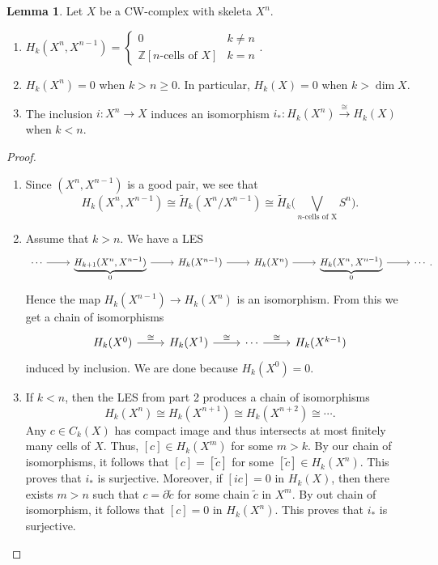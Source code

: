 \documentclass[10pt,letterpaper,cm]{nupset}
\theoremstyle{definition}
\theoremstyle{theorem}
\newtheorem{lemma}[definition]{Lemma}
\theoremstyle{remark}
\newcommand{\Z}{\mathbb Z}
\newcommand{\1}{\mathbb{1}}
\newcommand{\0}{\vec 0}
\begin{document}
\begin{lemma}
Let $X$ be a CW-complex with skeleta $X^n$.
\begin{enumerate}
\item $H_k(X^n, X^{n-1}) =\begin{cases}  0 & k\ne n \\ \Z[n\text{-cells of } X] & k= n  \end{cases}$.
\item $H_k(X^n) =0$ when $k>n\geq 0$. In particular, $H_k(X) = 0$ when $k> \dim{X}$.
\item The inclusion $i: X^n \to X$ induces an isomorphism $i_{\ast} : H_k(X^n) \overset{\cong}{\longrightarrow} H_k(X)$ when $k<n$.
\end{enumerate}
\end{lemma}
\begin{proof} $ $
\begin{enumerate}
\item Since $(X^n, X^{n-1})$ is a good pair, we see that $$H_k(X^n, X^{n-1}) \cong \widetilde{H}_k(X^n/X^{n-1}) \cong \widetilde{H}_k \big (\bigvee_{n\text{-cells of X}} S^n \big ).$$
\item Assume that $k>n$. We have a LES 
\[
\begin{tikzcd}
\cdots \arrow[r] & {\underbrace{H_{k+1}(X^n, X^{n-1})}_{0}} \arrow[r] & H_k(X^{n-1}) \arrow[r] & H_k(X^n) \arrow[r] & {\underbrace{H_k(X^n, X^{n-1})}_{0}} \arrow[r] & \cdots
\end{tikzcd}
.\] Hence the map $H_k(X^{n-1}) \to H_k(X^n)$ is an isomorphism. From this we get a chain of isomorphisms
\[
\begin{tikzcd}
H_k(X^0) \arrow[r, "\cong"] & H_k(X^1) \arrow[r, "\cong"] & \cdots \arrow[r, "\cong"] & H_k(X^{k-1})
\end{tikzcd}
\] induced by inclusion.  We are done because $H_k(X^0)=0$.
\item If $k<n$, then the LES from part 2 produces a chain of isomorphisms 
\[
H_k(X^n) \cong H_k(X^{n+1}) \cong H_k(X^{n+2}) \cong \cdots
.\] Any $c \in C_k(X)$ has compact image and thus intersects at most finitely many cells of $X$. Thus, $[c] \in H_k(X^m)$ for some $m>k$. By our chain of isomorphisms, it follows that $[c] = [\tilde{c}]$ for some $[\tilde{c}]\in H_k(X^n)$. This proves that $i_{\ast}$ is surjective. Moreover, if $[ic] = 0$ in $H_k(X)$, then there exists $m >n$ such that $c = \partial{\tilde{c}}$ for some chain $\tilde{c}$ in $X^m$. By out chain of isomorphism, it follows that $[c]=0$ in $H_k(X^n)$. This proves that $i_{\ast}$ is surjective. 
\end{enumerate}
\end{proof}
\end{document}
